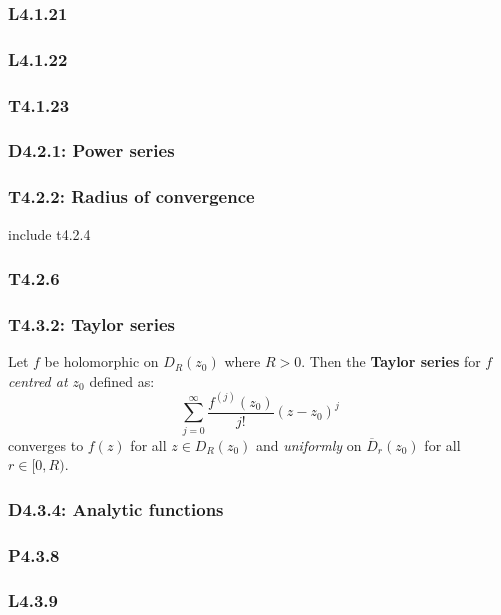 \documentclass{article}
\begin{document}
\begin{multicols*}{3}
\subsubsection*{L4.1.21}

\subsubsection*{L4.1.22}

\subsubsection*{T4.1.23}

\newcolumn

\subsubsection*{D4.2.1: Power series}

\subsubsection*{T4.2.2: Radius of convergence}
include t4.2.4

\subsubsection*{T4.2.6}

\newcolumn

\subsubsection*{T4.3.2: Taylor series}
Let $f$ be holomorphic on $D_R(z_0)$ where $R>0$. Then the
\textbf{Taylor series} for $f$ \textit{centred at $z_0$} defined as:
$$\sum_{j=0}^{\infty}\frac{f^{(j)}(z_0)}{j!}(z-z_0)^j$$
converges to $f(z)$ for all $z\in D_R(z_0)$ and \textit{uniformly}
on $\overline{D}_r(z_0)$ for all $r\in[0,R)$.

\subsubsection*{D4.3.4: Analytic functions}

\subsubsection*{P4.3.8}

\subsubsection*{L4.3.9}


\end{multicols*}
\end{document}
